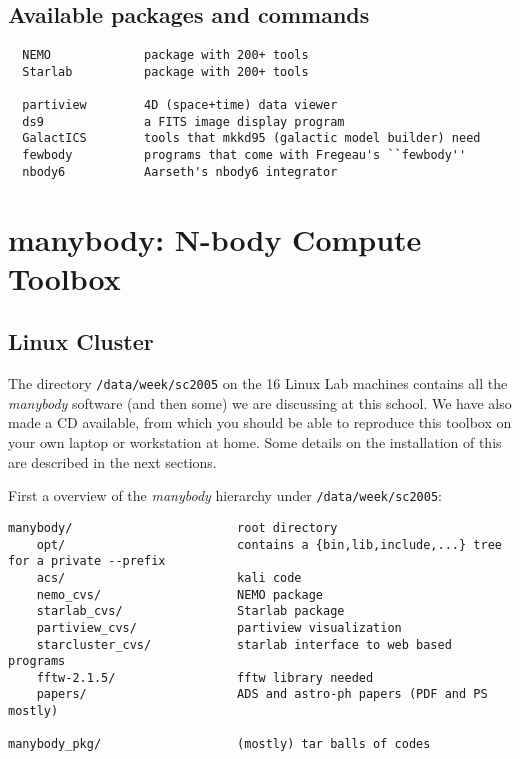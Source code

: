 \section{Available packages and commands}

\begin{verbatim}
  NEMO             package with 200+ tools
  Starlab          package with 200+ tools

  partiview        4D (space+time) data viewer
  ds9              a FITS image display program
  GalactICS        tools that mkkd95 (galactic model builder) need
  fewbody          programs that come with Fregeau's ``fewbody''
  nbody6           Aarseth's nbody6 integrator
\end{verbatim}


\chapter                {manybody: N-body Compute Toolbox}



\section{Linux Cluster}

The directory {\tt /data/week/sc2005} on the 16 Linux Lab machines
contains all the {\it manybody} software (and then some)  
we are discussing at this school. We have
also made a CD available, from which you should be able to reproduce this
toolbox on your own laptop or workstation at home. 
Some details on the installation of this are described in the next sections.

First a overview of the {\it manybody} hierarchy under {\tt /data/week/sc2005}:

\begin{verbatim}
manybody/                       root directory
    opt/                        contains a {bin,lib,include,...} tree for a private --prefix
    acs/                        kali code
    nemo_cvs/                   NEMO package
    starlab_cvs/                Starlab package
    partiview_cvs/              partiview visualization 
    starcluster_cvs/            starlab interface to web based programs
    fftw-2.1.5/                 fftw library needed 
    papers/                     ADS and astro-ph papers (PDF and PS mostly)

manybody_pkg/                   (mostly) tar balls of codes 
    
\end{verbatim}



